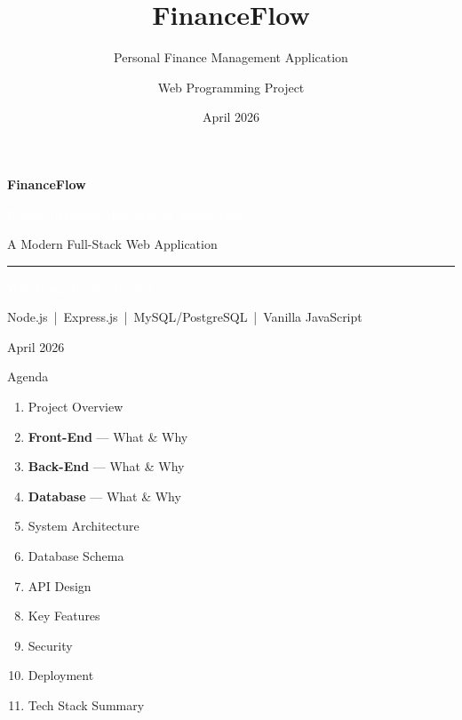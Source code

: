 \documentclass[aspectratio=169, 12pt]{beamer}
\title{FinanceFlow}
\subtitle{Personal Finance Management Application}
\author{Web Programming Project}
\date{April 2026}
\begin{document}
{
\begin{frame}[plain]
\begin{center}
\vspace{1.5cm}
{\Huge\bfseries\textcolor{primary}{FinanceFlow}}\par
\vspace{8pt}
{\large\textcolor{white}{Personal Finance Management Application}}\par
\vspace{6pt}
{\small\textcolor{gray!50}{A Modern Full-Stack Web Application}}\par
\vspace{1.2cm}
\textcolor{primary}{\rule{0.4\textwidth}{2pt}}\par
\vspace{1.2cm}
{\normalsize\textcolor{white}{Web Programming Project}}\par
\vspace{8pt}
{\small\textcolor{gray!50}{Node.js \,|\, Express.js \,|\, MySQL/PostgreSQL \,|\, Vanilla JavaScript}}\par
\vspace{8pt}
{\small\textcolor{gray!60}{April 2026}}\par
\end{center}
\end{frame}
}

\begin{frame}{Agenda}
\begin{enumerate}\itemsep=10pt
    \item Project Overview
    \item \textbf{Front-End} --- What \& Why
    \item \textbf{Back-End} --- What \& Why
    \item \textbf{Database} --- What \& Why
    \item System Architecture
    \item Database Schema
    \item API Design
    \item Key Features
    \item Security
    \item Deployment
    \item Tech Stack Summary
\end{enumerate}
\end{frame}
\end{document}
